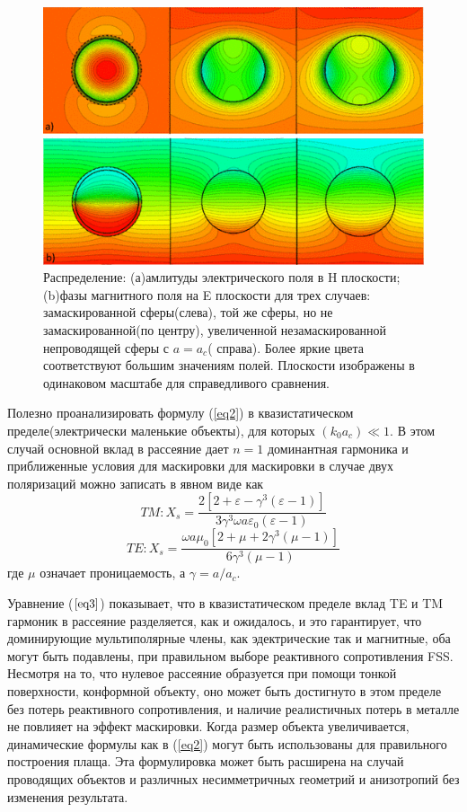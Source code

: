 \documentclass[12pt,a4paper]{article}
\begin{document}
\begin{figure}[t]
  \centering
  \includegraphics[height=0.16\paperheight, width=0.4\paperwidth]{3.png}
  \caption{Распределение: (а)амлитуды электрического поля в H плоскости;(b)фазы магнитного 
  поля на E плоскости для трех случаев: замаскированной сферы(слева), той же сферы, но не 
  замаскированной(по центру), увеличенной незамаскированной непроводящей сферы с $a=a_c$(
  справа). Более яркие цвета соответствуют большим значениям полей. Плоскости изображены в 
  одинаковом масштабе для справедливого сравнения.}
  \label{fig:3}
\end{figure}

Полезно проанализировать формулу (\ref{eq2}) в квазистатическом пределе(электрически 
маленькие объекты), 
для которых $(k_0a_c) \ll 1$. В этом случай основной вклад в рассеяние дает
$n=1$ доминантная гармоника и приближенные условия для маскировки для маскировки в 
случае двух поляризаций можно записать в явном виде как
\begin{equation*}
TM:X_s = 
\frac{2[2+\varepsilon-\gamma^3(\varepsilon-1)]}{3\gamma^3\omega a\varepsilon_0(\varepsilon-1)
}
\end{equation*}
\begin{equation}\label{eq3}
TE:X_s = \frac{\omega a\mu_0[2+\mu+2\gamma^3(\mu-1)]}{6\gamma^3(\mu-1)}
\end{equation}
где $\mu$ означает проницаемость, а $\gamma=a/a_c$.

Уравнение ($\ref{eq3}$) показывает, что в квазистатическом пределе вклад TE и TM гармоник в 
рассеяние разделяется, как и ожидалось, и это гарантирует, что доминирующие мультиполярные
члены, как эдектрические так и магнитные, оба могут быть подавлены, при правильном выборе
реактивного сопротивления FSS. Несмотря на то, что нулевое рассеяние образуется при помощи 
тонкой поверхности, конформной объекту, оно может быть достигнуто в этом пределе без потерь 
реактивного сопротивления, и наличие реалистичных потерь в металле не повлияет на эффект 
маскировки. Когда размер объекта увеличивается, динамические формулы как в (\ref{eq2}) могут
быть использованы для правильного построения плаща. Эта формулировка может быть расширена на
случай проводящих объектов и различных несимметричных геометрий и анизотропий без изменения
результата.
\end{document}
